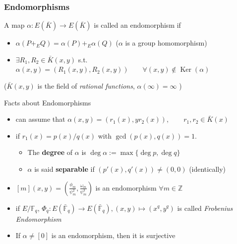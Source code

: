 \documentclass[10pt,final]{beamer} %
\newcommand{\Z}{\mathbb Z}
\newcommand{\F}{\mathbb F}
\theoremstyle{definition}
\begin{document}
\begin{frame}
\frametitle{Endomorphisms}

\begin{definition} A map \alert{$\alpha: E(\bar{K})\rightarrow E(\bar{K})$} is called
an \alert{endomorphism} if\pause
\begin{itemize}[<+-| alert@+>]
  \item $\alpha(P+_EQ)=\alpha(P)+_E\alpha(Q)$ ($\alpha$ is a group homomorphism)
  \item $\exists R_1,R_2\in \bar{K}(x,y)$ s.t. $\alpha(x,y)=(R_1(x,y),R_2(x,y))\qquad\forall (x,y)\not\in\operatorname{Ker}(\alpha) $
\end{itemize}\pause
($\bar{K}(x,y)$ is the field of \emph{rational functions}, \pause  $\alpha(\infty)=\infty$
)\vspace*{-1pt}
\end{definition}\vspace*{-3.5pt}\pause

\begin{block}{Facts about Endomorphisms}
\begin{itemize}[<+-| alert@+>]
  \item can assume that $\alpha(x,y)=(r_1(x),yr_2(x)),\qquad  r_1,r_2\in\bar{K}(x)$
\item if
$r_1(x)=p(x)/q(x)$ with $\gcd(p(x),q(x))=1$.
\begin{itemize}[<+-| alert@+>]
 \item The \textbf{degree} of $\alpha$ is $\deg\alpha:=\max\{\deg p,\deg q\}$
 \item $\alpha$ is said \textbf{separable} if $(p'(x),q'(x))\neq(0,0)$ \hfill (identically)
\end{itemize}
 \item $[m](x,y)=\left(\frac{\phi_m}{\psi_m^2},\frac{\omega_m}{\psi_m^3}\right)$ is an
endomorphism $\forall m\in\Z$
 \item if $E/\F_q$, $\Phi_q:E(\bar{\F}_q)\rightarrow E(\bar{\F}_q), (x,y)\mapsto(x^q,y^q)$ is called
\emph{Frobenius Endomorphism}
\item If $\alpha\neq[0]$ is an endomorphism, then it is surjective
\end{itemize}
\end{block}
\end{frame}
\end{document}
